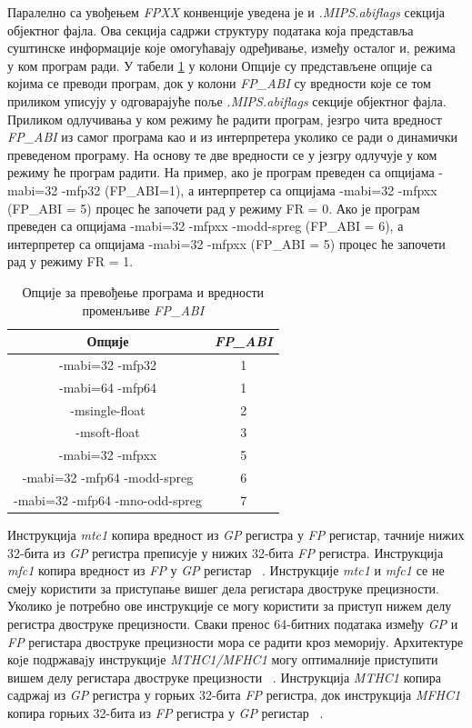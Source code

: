 \documentclass[12pt,oneside]{memoir}
\begin{document}
\indent Паралелно са увођењем \textit{FPXX} конвенције уведена је и  \textit{.MIPS.abiflags} секција објектног фајла. Ова секција садржи структуру података која представља суштинске информације које омогућавају одређивање, између осталог и, режима у ком програм ради. У табели \ref{tbl:fpabi} у колони Опције су представљене опције са којима се преводи програм, док у колони \textit{FP\_ABI} су вредности које се том приликом уписују у одговарајуће поље \textit{.MIPS.abiflags} секције објектног фајла. Приликом одлучивања у ком режиму ће радити програм, језгро чита вредност \textit{FP\_ABI} из самог програма као и из интерпретера уколико се ради о динамички преведеном програму. На основу те две вредности се у језгру одлучује у ком режиму ће програм радити. На пример, ако је програм преведен са опцијама -mabi=32 -mfp32 (FP\_ABI=1), а интерпретер са опцијама  -mabi=32 -mfpxx (FP\_ABI = 5) процес ће започети рад у режиму FR = 0. Ако је програм преведен са опцијама -mabi=32 -mfpxx -modd-spreg (FP\_ABI = 6), а интерпретер са опцијама  -mabi=32 -mfpxx (FP\_ABI = 5) процес ће започети рад у режиму FR = 1.


\begin{table}
\centering
\caption{Опције за превођење програма и вредности променљиве \textit{FP\_ABI}}
\label{tbl:fpabi}
\begin{tabular}{ |c|c| }
Опције & \textit{FP\_ABI} \\\midrule
-mabi=32 -mfp32 & 1 \\
-mabi=64 -mfp64 & 1 \\
-msingle-float  & 2 \\
-msoft-float    & 3 \\
-mabi=32 -mfpxx & 5 \\
-mabi=32 -mfp64 -modd-spreg & 6 \\
-mabi=32 -mfp64 -mno-odd-spreg & 7 \\
\end{tabular}
\end{table}

\indent Инструкција \textit{mtc1} копира вредност из \textit{GP} регистра у \textit{FP} регистар, тачније нижих 32-бита из \textit{GP} регистра  преписује у нижих 32-бита \textit{FP} регистра. Инструкција \textit{mfc1} копира вредност из \textit{FP} у \textit{GP} регистар ~\cite{MIPSInstrSet}. Инструкције \textit{mtc1} и \textit{mfc1} се не смеју користити за приступање вишег дела регистара двоструке прецизности. Уколико је потребно ове инструкције се могу користити за приступ нижем делу регистра двоструке прецизности. Сваки пренос 64-битних података између \textit{GP} и \textit{FP} регистара двоструке прецизности мора се радити кроз меморију. Архитектуре коjе подржаваjу инструкциjе \textit{MTHC1/MFHC1} могу оптималније приступити вишем делу регистара двоструке прецизности ~\cite{fpxxRef}. Инструкција \textit{MTHC1} копира садржај из \textit{GP} регистра у горњих 32-бита \textit{FP} регистра, док инструкција \textit{MFHC1} копира горњих 32-бита из \textit{FP} регистра у \textit{GP} регистар ~\cite{MIPSInstrSet}.
\end{document}

